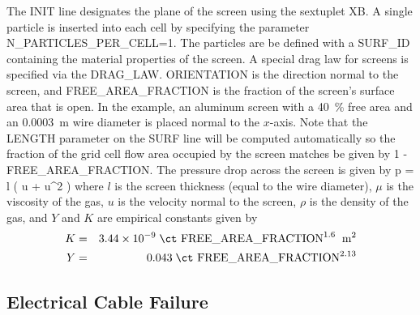 \documentclass[11pt]{book}
\begin{document}
\noindent The {\ct INIT} line designates the plane of the screen using the sextuplet {\ct XB}. A single particle is inserted into each cell by specifying the parameter {\ct N\_PARTICLES\_PER\_CELL=1}.  The particles are be defined with a {\ct SURF\_ID} containing the material properties of the screen.  A special drag law for screens is specified via the {\ct DRAG\_LAW}.  {\ct ORIENTATION} is the direction normal to the screen, and {\ct FREE\_AREA\_FRACTION} is the fraction of the screen's surface area that is open. In the example, an aluminum screen with a 40~\% free area and an 0.0003~m wire diameter is placed normal to the $x$-axis.  Note that the {\ct LENGTH} parameter on the {\ct SURF} line will be computed automatically so the fraction of the grid cell flow area occupied by the screen matches be given by 1 - {\ct FREE\_AREA\_FRACTION}. The pressure drop across the screen is given by
\be
   \Delta p =  l \; \left( u + \rho {} u^2 \right)
\ee
where $l$ is the screen thickness (equal to the wire diameter), $\mu$ is the viscosity of the gas, $u$ is the velocity normal to the screen, $\rho$ is the density of the gas, and $Y$ and $K$ are empirical constants given by
\begin{eqnarray}
   K &=& 3.44 \times 10^{-9} \; \hbox{\ct FREE\_AREA\_FRACTION}^{1.6} \; \; \hbox{m}^2 \\
   Y &=& 0.043 \; \hbox{\ct FREE\_AREA\_FRACTION}^{2.13}
\end{eqnarray}


\subsection{Electrical Cable Failure}
\label{info:THIEF}
\end{document}

